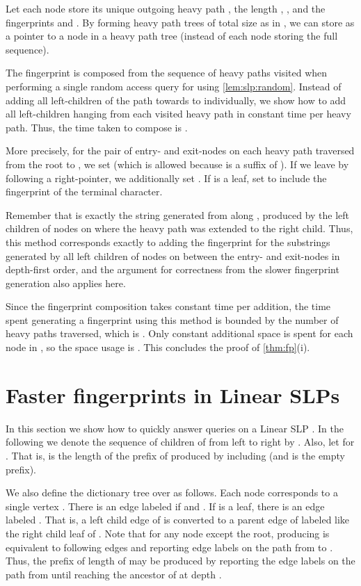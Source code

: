 \documentclass[11pt]{article}
\begin{document}
Let each node  store its unique outgoing heavy path , the length , , and the fingerprints  and . By forming heavy path trees of total size  as in \cite{bille2011random}, we can store  as a pointer to a node in a heavy path tree (instead of each node storing the full sequence).

The fingerprint  is composed from the sequence of heavy paths visited when performing a single random access query for  using \autoref{lem:slp:random}. Instead of adding all left-children of the path towards  to  individually, we show how to add all left-children hanging from each visited heavy path in constant time per heavy path. Thus, the time taken to compose  is . 

More precisely, for the pair of entry- and exit-nodes  on each heavy path  traversed from the root to , we set  (which is allowed because  is a suffix of ). If we leave  by following a right-pointer, we additionally set . If  is a leaf, set  to include the fingerprint of the terminal character. 

Remember that  is exactly the string generated from  along , produced by the left children of nodes on  where the heavy path was extended to the right child. Thus, this method corresponds exactly to adding the fingerprint for the substrings generated by all left children of nodes on  between the entry- and exit-nodes in depth-first order, and the argument for correctness from the slower fingerprint generation also applies here.

Since the fingerprint composition takes constant time per addition, the time spent generating a fingerprint using this method is bounded by the number of heavy paths traversed, which is . Only constant additional space is spent for each node in , so the space usage is . This concludes the proof of \autoref{thm:fp}(i).

\section{Faster fingerprints in Linear SLPs}
In this section we show how to quickly answer  queries on a Linear SLP . In the following we denote the sequence of  children of  from left to right by . Also, let  for . That is,  is the length of the prefix of  produced by  including  (and  is the empty prefix).

We also define the dictionary tree  over  as follows. Each node  corresponds to a single vertex . There is an edge  labeled  if  and . If  is a leaf, there is an edge  labeled . That is, a left child edge of  is converted to a parent edge of  labeled like the right child leaf of . Note that for any node  except the root, producing  is equivalent to following edges and reporting edge labels on the path from  to . Thus, the prefix of length  of  may be produced by reporting the edge labels on the path from  until reaching the ancestor of  at depth .
\end{document}
